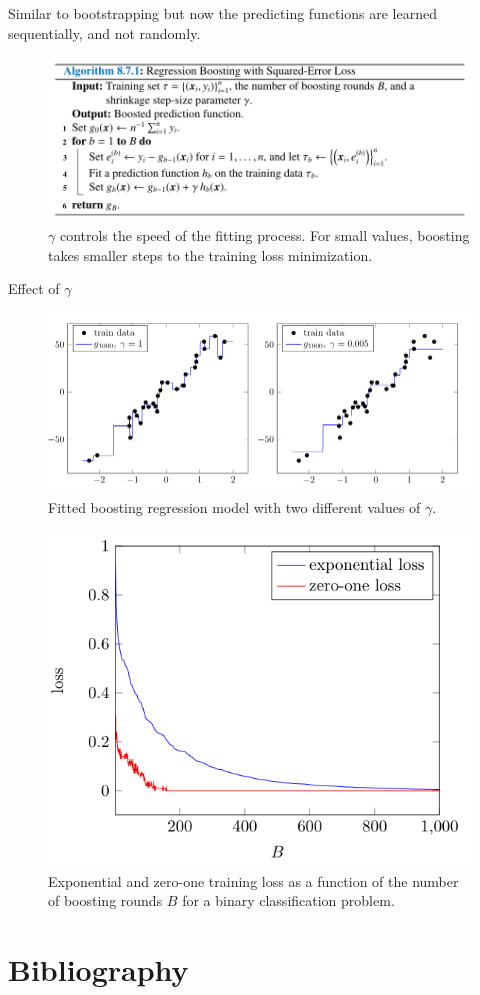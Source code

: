 \documentclass{beamer}
\begin{document}
\begin{frame}
    Similar to bootstrapping but now the predicting functions are learned sequentially, and not randomly.
    \begin{figure}
        \includegraphics[width=0.9\linewidth]{A871Kroese}
        \caption{$\gamma$ controls the speed of the fitting process. For small values, boosting takes smaller steps to the training loss minimization.}
    \end{figure}
\end{frame}

\begin{frame}{Effect of $\gamma$}
    \begin{figure}
        \includegraphics[width=0.9\linewidth]{F810Kroese}
        \caption{Fitted boosting regression model with two different values of $\gamma$. \cite{kroese2020}}
    \end{figure}
\end{frame}

\begin{frame}
    \begin{figure}
        \includegraphics[width=0.7\linewidth]{F811Kroese}
        \caption{Exponential and zero-one training loss as a function of the number of boosting rounds $B$ for a binary classification problem. \cite{kroese2020}}
    \end{figure}
\end{frame}

\section{Bibliography}


\end{document}
